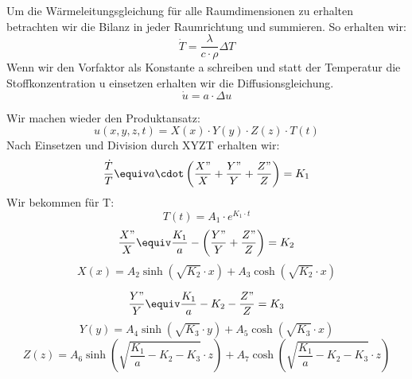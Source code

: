 \documentclass[
	11pt, %
]{beamer}
\begin{document}
\begin{frame}
	\begin{exampleblock}{}
		Um die W\"armeleitungsgleichung f\"ur alle Raumdimensionen zu erhalten betrachten wir die Bilanz in jeder Raumrichtung und summieren. So erhalten wir:
		\begin{equation}
			\dot{T}=\frac{\lambda}{c\cdot \rho}\Delta T
		\end{equation}
		Wenn wir den Vorfaktor als Konstante a schreiben und statt der Temperatur die Stoffkonzentration u einsetzen erhalten wir die Diffusionsgleichung.
		\begin{equation}
			\dot{u}=a\cdot\Delta u
		\end{equation}
	\end{exampleblock}
\end{frame}
\begin{frame}
	\begin{exampleblock}{}
Wir machen wieder den Produktansatz:
		\begin{equation}
			u(x,y,z,t)=X(x)\cdot Y(y)\cdot Z(z)\cdot T(t)
		\end{equation}
		Nach Einsetzen und Division durch XYZT erhalten wir:
		\begin{equation}
			\frac{\dot{T}}{T} \equiv a\cdot\left(\frac{X"}{X}+\frac{Y"}{Y}+\frac{Z"}{Z}\right)=K_1
		\end{equation}
		Wir bekommen f\"ur T:
		\begin{equation}
			T(t)=A_1\cdot e^{K_1\cdot t}
		\end{equation}
		\begin{equation}
			\frac{X"}{X}\equiv \frac{K_1}{a}-\left(\frac{Y"}{Y}+\frac{Z"}{Z}\right)=K_2
		\end{equation}
		\begin{equation}
			X(x)=A_2\sinh\left(\sqrt{K_2}\cdot x\right)+A_3\cosh\left(\sqrt{K_2}\cdot x\right)
		\end{equation}
	\end{exampleblock}
\end{frame}
\begin{frame}
	\begin{exampleblock}{}
		\begin{equation}
			\frac{Y"}{Y}\equiv \frac{K_1}{a}-K_2-\frac{Z"}{Z}=K_3
		\end{equation}
		\begin{equation}
			Y(y)=A_4\sinh\left(\sqrt{K_3}\cdot y\right)+A_5\cosh\left(\sqrt{K_3}\cdot x\right)
		\end{equation}
		\begin{equation}
			Z(z)=A_6\sinh\left(\sqrt{\frac{K_1}{a}-K_2-K_3}\cdot z\right)+A_7\cosh\left(\sqrt{\frac{K_1}{a}-K_2-K_3}\cdot z\right)
		\end{equation}
	\end{exampleblock}
\end{frame}
\end{document}
